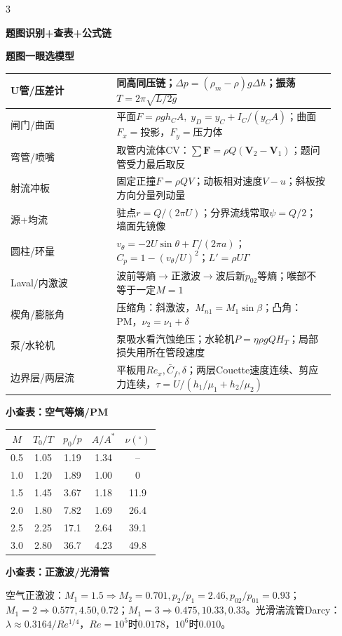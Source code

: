 \documentclass[a4paper]{article}
\newcommand{\qt}[1]{\vspace{0.25pt}\colorbox{Q}{\parbox{\dimexpr\linewidth-2\fboxsep}{\color{white}\bfseries #1}}\par}
\newcommand{\sect}[1]{\qt{#1}}
\begin{document}
\begin{multicols}{3}
{\sect{题图识别+查表+公式链}
\sect{题图一眼选模型}
\renewcommand{\arraystretch}{0.67}\begin{tabular}{|p{0.30\linewidth}|p{0.62\linewidth}|}
\hline U管/压差计 & 同高同压链；$\Delta p=(\rho_m-\rho)g\Delta h$；振荡$T=2\pi\sqrt{L/2g}$\\ \hline
闸门/曲面 & 平面$F=\rho gh_CA,\;y_D=y_C+I_C/(y_CA)$；曲面$F_x=$投影，$F_y=$压力体\\ \hline
弯管/喷嘴 & 取管内流体CV：$\sum\bm F=\rho Q(\bm V_2-\bm V_1)$；题问管受力最后取反\\ \hline
射流冲板 & 固定正撞$F=\rho QV$；动板相对速度$V-u$；斜板按方向分量列动量\\ \hline
源+均流 & 驻点$r=Q/(2\pi U)$；分界流线常取$\psi=Q/2$；墙面先镜像\\ \hline
圆柱/环量 & $v_\theta=-2U\sin\theta+\Gamma/(2\pi a)$；$C_p=1-(v_\theta/U)^2$；$L'=\rho U\Gamma$\\ \hline
Laval/内激波 & 波前等熵$\to$正激波$\to$波后新$p_{02}$等熵；喉部不等于一定$M=1$\\ \hline
楔角/膨胀角 & 压缩角：斜激波，$M_{n1}=M_1\sin\beta$；凸角：PM，$\nu_2=\nu_1+\delta$\\ \hline
泵/水轮机 & 泵吸水看汽蚀绝压；水轮机$P=\eta\rho gQH_T$；局部损失用所在管段速度\\ \hline
边界层/两层流 & 平板用$Re_x,\bar C_f,\delta$；两层Couette速度连续、剪应力连续，$\tau=U/(h_1/\mu_1+h_2/\mu_2)$\\ \hline
\end{tabular}\renewcommand{\arraystretch}{1}

\sect{小查表：空气等熵/PM}
\renewcommand{\arraystretch}{0.66}\begin{tabular}{|c|c|c|c|c|}
\hline $M$&$T_0/T$&$p_0/p$&$A/A^*$&$\nu(^\circ)$\\ \hline
0.5&1.05&1.19&1.34&--\\ \hline
1.0&1.20&1.89&1.00&0\\ \hline
1.5&1.45&3.67&1.18&11.9\\ \hline
2.0&1.80&7.82&1.69&26.4\\ \hline
2.5&2.25&17.1&2.64&39.1\\ \hline
3.0&2.80&36.7&4.23&49.8\\ \hline
\end{tabular}\renewcommand{\arraystretch}{1}

\sect{小查表：正激波/光滑管}
空气正激波：$M_1=1.5\Rightarrow M_2=0.701,p_2/p_1=2.46,p_{02}/p_{01}=0.93$；$M_1=2\Rightarrow0.577,4.50,0.72$；$M_1=3\Rightarrow0.475,10.33,0.33$。光滑湍流管Darcy：$\lambda\approx0.3164/Re^{1/4}$，$Re=10^5$时$0.0178$，$10^6$时$0.010$。

}
\end{multicols}
\end{document}
